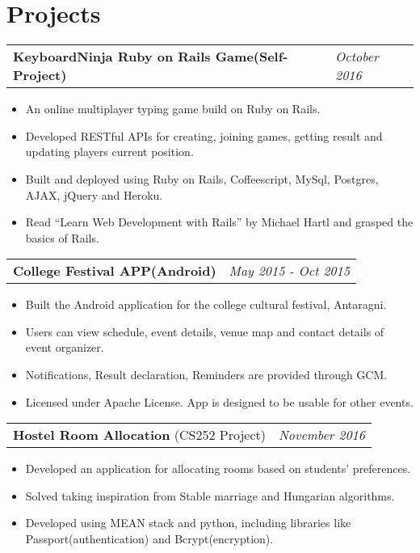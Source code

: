 \documentclass{article}
\begin{document}
\section{Projects}
\begin{tabularx}{\textwidth}{Xl}
	      \textbf{KeyboardNinja Ruby on Rails Game(Self-Project)}
	      & \textit{October 2016}
	      \end{tabularx}
	      \begin{itemize}
		\vspace{-2mm} \setlength\itemsep{-0.5em}
		\item An online multiplayer typing game build on Ruby on Rails.
		\item Developed RESTful APIs for creating, joining games, getting result and updating players current position.
		\item Built and deployed using Ruby on Rails, Coffeescript, MySql, Postgres, AJAX, jQuery and Heroku.
		\item Read ``Learn Web Development with Rails'' by Michael Hartl and grasped the basics of Rails.
	      \end{itemize}
\begin{tabularx}{\textwidth}{Xl}
	      \textbf{College Festival APP(Android)}
	     & \textit{May 2015 - Oct 2015}
	      \end{tabularx}
	      \begin{itemize}
	      	\vspace{-2mm} \setlength\itemsep{-0.5em}
	      	\item Built the Android application for the college cultural festival, Antaragni.
	      	\item Users can view schedule, event details, venue map and contact details of event organizer.
	      	\item Notifications, Result declaration, Reminders are provided through GCM.
	      	\item Licensed under Apache License. App is designed to be usable for other events.
	      \end{itemize}
\begin{tabularx}{\textwidth}{Xl}
	 \textbf{Hostel Room Allocation} (CS252 Project)
	 & \textit{November 2016}
	 \end{tabularx}
\begin{itemize}
\vspace{-2mm} \setlength\itemsep{-0.5em}
\item Developed an application for allocating rooms based on students' preferences.
\item Solved taking inspiration from Stable marriage and Hungarian algorithms.
\item Developed using MEAN stack and python, including libraries like Passport(authentication) and Bcrypt(encryption).
\end{itemize}
\end{document}
